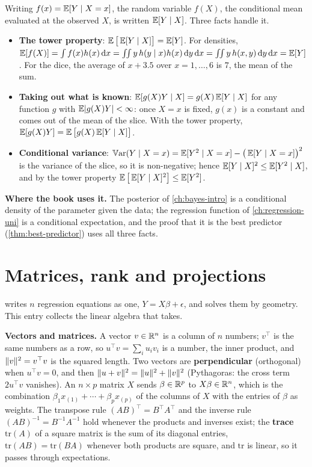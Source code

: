 Writing $f(x) = \operatorname*{\mathbb{E}}[Y \mid X = x]$, the random variable $f(X)$, the conditional mean evaluated at the observed $X$, is written $\operatorname*{\mathbb{E}}[Y \mid X]$. Three facts handle it.
\begin{itemize}[nosep]
\item \textbf{The tower property}: $\operatorname*{\mathbb{E}}\big[\operatorname*{\mathbb{E}}[Y \mid X]\big] = \operatorname*{\mathbb{E}}[Y]$. For densities, $\operatorname*{\mathbb{E}}[f(X)] = \int f(x)h(x)\,\mathrm{d}x = \iint y\,h(y \mid x)h(x)\,\mathrm{d}y\,\mathrm{d}x = \iint y\,h(x, y)\,\mathrm{d}y\,\mathrm{d}x = \operatorname*{\mathbb{E}}[Y]$. For the dice, the average of $x + 3.5$ over $x = 1, \ldots, 6$ is $7$, the mean of the sum.
\item \textbf{Taking out what is known}: $\operatorname*{\mathbb{E}}[g(X)Y \mid X] = g(X)\operatorname*{\mathbb{E}}[Y \mid X]$ for any function $g$ with $\operatorname*{\mathbb{E}}\lvert g(X)Y\rvert < \infty$: once $X = x$ is fixed, $g(x)$ is a constant and comes out of the mean of the slice. With the tower property, $\operatorname*{\mathbb{E}}[g(X)Y] = \operatorname*{\mathbb{E}}\big[g(X)\operatorname*{\mathbb{E}}[Y \mid X]\big]$.
\item \textbf{Conditional variance}: $\operatorname*{\mathbb{V}\text{ar}}(Y \mid X = x) = \operatorname*{\mathbb{E}}[Y^2 \mid X = x] - \big(\operatorname*{\mathbb{E}}[Y \mid X = x]\big)^2$ is the variance of the slice, so it is non-negative; hence $\operatorname*{\mathbb{E}}[Y \mid X]^2 \leq \operatorname*{\mathbb{E}}[Y^2 \mid X]$, and by the tower property $\operatorname*{\mathbb{E}}\big[\operatorname*{\mathbb{E}}[Y \mid X]^2\big] \leq \operatorname*{\mathbb{E}}[Y^2]$.
\end{itemize}

\textbf{Where the book uses it.} The posterior of \cref{ch:bayes-intro} is a conditional density of the parameter given the data; the regression function of \cref{ch:regression-uni} is a conditional expectation, and the proof that it is the best predictor (\cref{thm:best-predictor}) uses all three facts.

\section{Matrices, rank and projections}
\label{sec:math-matrices}

 writes $n$ regression equations as one, $Y = X\beta + \epsilon$, and solves them by geometry.
This entry collects the linear algebra that takes.

\textbf{Vectors and matrices.}
A vector $v \in \mathbb{R}^n$ is a column of $n$ numbers; $v^\top$ is the same numbers as a row, so $u^\top v = \sum_i u_iv_i$ is a number, the inner product, and $\lVert v\rVert^2 = v^\top v$ is the squared length.
Two vectors are \textbf{perpendicular} (orthogonal) when $u^\top v = 0$, and then $\lVert u + v\rVert^2 = \lVert u\rVert^2 + \lVert v\rVert^2$ (Pythagoras: the cross term $2u^\top v$ vanishes).
An $n \times p$ matrix $X$ sends $\beta \in \mathbb{R}^p$ to $X\beta \in \mathbb{R}^n$, which is the combination $\beta_1x_{(1)} + \cdots + \beta_px_{(p)}$ of the columns of $X$ with the entries of $\beta$ as weights.
The transpose rule $(AB)^\top = B^\top A^\top$ and the inverse rule $(AB)^{-1} = B^{-1}A^{-1}$ hold whenever the products and inverses exist; the \textbf{trace} $\mathrm{tr}(A)$ of a square matrix is the sum of its diagonal entries, $\mathrm{tr}(AB) = \mathrm{tr}(BA)$ whenever both products are square, and $\mathrm{tr}$ is linear, so it passes through expectations.

